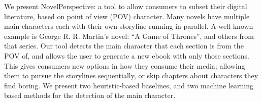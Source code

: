 We present NovelPerspective: a tool to allow consumers to subset their digital literature, based on point of view (POV) character. Many novels have multiple main characters each with their own storyline running in parallel. A well-known example is George R. R. Martin's  novel: ``A Game of Thrones'', and others from that series. Our tool detects the main character that each section is from the POV of, and allows the user to generate a new ebook with only those sections. This gives consumers new options in how they consume their media; allowing them to  pursue the storylines sequentially, or skip chapters about characters they find boring. We present two heuristic-based baselines, and two machine learning based methods for the detection of the main character.
